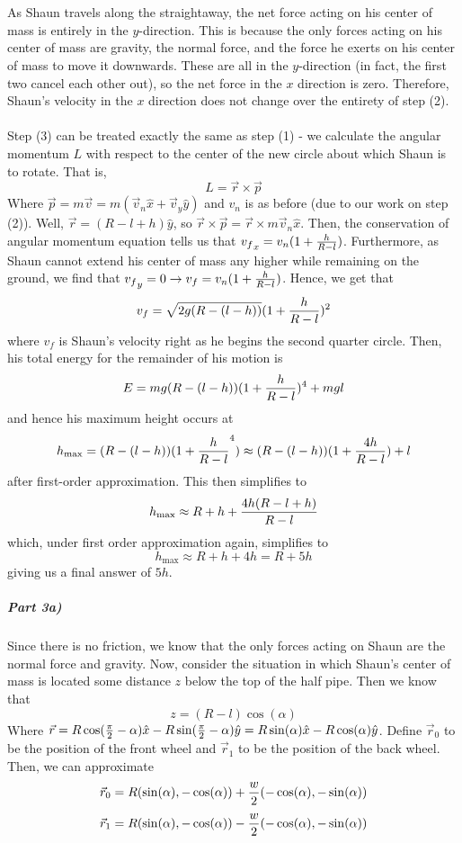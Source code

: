 \\\\ As Shaun travels along the straightaway, the net force acting on his center of mass is entirely in the $y$-direction.  This is because the only forces acting on his center of mass are gravity, the normal force, and the force he exerts on his center of mass to move it downwards.  These are all in the $y$-direction (in fact, the first two cancel each other out), so the net force in the $x$ direction is zero.  Therefore, Shaun's velocity in the $x$ direction does not change over the entirety of step (2).  
\\\\ Step (3) can be treated exactly the same as step (1) - we calculate the angular momentum $L$ with respect to the center of the new circle about which Shaun is to rotate.  That is, 
$$L=\vec r\times \vec p$$
Where $\vec p=m\vec v=m(\vec v_n \hat x+\vec v_y \hat y)$ and $v_n$ is as before (due to our work on step (2)).  Well, $\vec r=(R-l+h)\hat y$, so $\vec r\times \vec p=\vec r\times m\vec v_n \hat x$.  Then, the conservation of angular momentum equation tells us that ${v_f}_x=v_n (1+\frac{h}{R-l})$.  Furthermore, as Shaun cannot extend his center of mass any higher while remaining on the ground, we find that ${v_f}_y=0\rightarrow v_f=v_n(1+\frac{h}{R-l})$.  Hence, we get that
$$v_f=\sqrt{2g(R-(l-h))}(1+\frac{h}{R-l})^2$$
where $v_f$ is Shaun's velocity right as he begins the second quarter circle.  Then, his total energy for the remainder of his motion is
$$E=mg(R-(l-h)) (1+\frac{h}{R-l})^4+mgl$$
and hence his maximum height occurs at
$$h_{\max}=(R-(l-h))(1+\frac{h}{R-l}^4)\approx (R-(l-h))(1+\frac{4h}{R-l})+l$$
after first-order approximation.  This then simplifies to
$$h_{\max}\approx R+h+\frac{4h(R-l+h)}{R-l}$$
which, under first order approximation again, simplifies to
$$h_{\max}\approx R+h+4h=R+5h$$
giving us a final answer of $5h$.
\subparagraph{Part 3a)}
Since there is no friction, we know that the only forces acting on Shaun are the normal force and gravity. Now, consider the situation in which Shaun's center of mass is located some distance $z$ below the top of the half pipe. Then we know that
$$z=(R-l)\cos(\alpha)$$
Where $\vec r=R\cos(\frac \pi 2-\alpha)\hat x-R\sin(\frac \pi 2-\alpha)\hat y=R\sin(\alpha)\hat x-R\cos(\alpha)\hat y$.  Define $\vec r_0$ to be the position of the front wheel and $\vec r_1$ to be the position of the back wheel.  Then, we can approximate 
$$\vec r_0=R(\sin(\alpha), -\cos(\alpha))+\frac{w}{2}(-\cos(\alpha), -\sin(\alpha))$$
$$\vec r_1=R(\sin(\alpha), -\cos(\alpha))-\frac w 2(-\cos(\alpha), -\sin(\alpha))$$
